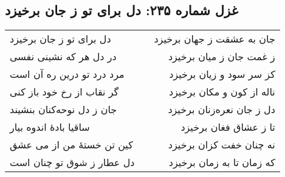 \begin{center}
\section*{غزل شماره ۲۳۵: دل برای تو ز جان برخیزد}
\label{sec:235}
\begin{longtable}{l p{0.5cm} r}
دل برای تو ز جان برخیزد
&&
جان به عشقت ز جهان برخیزد
\\
در دل هر که نشینی نفسی
&&
ز غمت جان ز میان برخیزد
\\
مرد درد تو درین ره آن است
&&
کز سر سود و زیان برخیزد
\\
گر نقاب از رخ خود باز کنی
&&
ناله از کون و مکان برخیزد
\\
جان ز دل نوحه‌کنان بنشیند
&&
دل ز جان نعره‌زنان برخیزد
\\
ساقیا بادهٔ اندوه بیار
&&
تا ز عشاق فغان برخیزد
\\
کین تن خستهٔ من از می عشق
&&
نه چنان خفت کزان برخیزد
\\
دل عطار ز شوق تو چنان است
&&
که زمان تا به زمان برخیزد
\\
\end{longtable}
\end{center}
